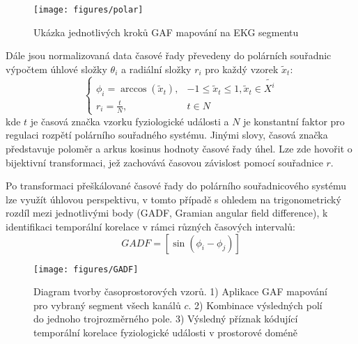 \begin{figure}[!htb]
    \begin{center}
        \texttt{[image: figures/polar]}
        \caption{Ukázka jednotlivých kroků \gls{GAF} mapování na EKG segmentu}
        \label{fig:polar}
    \end{center}
\end{figure}

Dále jsou normalizovaná data časové řady převedeny do polárních souřadnic
výpočtem úhlové složky $\theta_i$ a radiální složky $r_i$ pro každý vzorek
$\tilde{x}_t$:
\begin{equation}
    \begin{cases}
        \phi_i = \arccos(\tilde{x}_t), & -1 \leq \tilde{x}_t \leq 1, \tilde{x}_t \in \tilde{X^i} \\
        r_i = \frac{t}{N},               & t \in N
    \end{cases}
\end{equation}
kde $t$ je časová značka vzorku fyziologické události a $N$ je konstantní faktor
pro regulaci rozpětí polárního souřadného systému. Jinými slovy, časová značka
představuje poloměr a arkus kosinus hodnoty časové řady úhel. Lze zde hovořit o
bijektivní transformaci, jež zachovává časovou závislost pomocí souřadnice $r$.

Po transformaci přeškálované časové řady do polárního souřadnicového systému lze
využít úhlovou perspektivu, v tomto případě s ohledem na trigonometrický rozdíl
mezi jednotlivými body (\gls{GADF}, Gramian angular field difference), k
identifikaci temporální korelace v rámci různých časových intervalů:
\begin{equation}
    GADF = \left[\sin \left(\phi_i-\phi_j\right)\right]
\end{equation}

\begin{figure}[!htb]
    \begin{center}
        \texttt{[image: figures/GADF]}
        \caption{Diagram tvorby časoprostorových vzorů. 1) Aplikace GAF mapování
            pro vybraný segment všech kanálů $c$. 2) Kombinace výsledných polí
            do jednoho trojrozměrného pole. 3) Výsledný příznak kódující
            temporální korelace fyziologické události v prostorové doméně}
        \label{fig:gadf}
    \end{center}
\end{figure}

